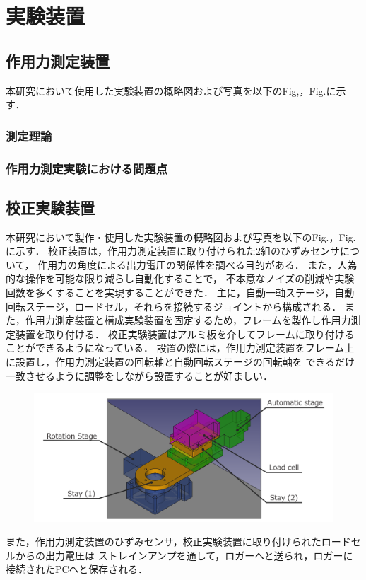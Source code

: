 \section{実験装置}

\subsection{作用力測定装置}
本研究において使用した実験装置の概略図および写真を以下のFig,，Fig.に示す．

\subsubsection{測定理論}

\subsubsection{作用力測定実験における問題点}

\subsection{校正実験装置}
本研究において製作・使用した実験装置の概略図および写真を以下のFig.，Fig.に示す．
校正装置は，作用力測定装置に取り付けられた2組のひずみセンサについて，
作用力の角度による出力電圧の関係性を調べる目的がある．
また，人為的な操作を可能な限り減らし自動化することで，
不本意なノイズの削減や実験回数を多くすることを実現することができた．
主に，自動一軸ステージ，自動回転ステージ，ロードセル，それらを接続するジョイントから構成される．
また，作用力測定装置と構成実験装置を固定するため，フレームを製作し作用力測定装置を取り付ける．
校正実験装置はアルミ板を介してフレームに取り付けることができるようになっている．
設置の際には，作用力測定装置をフレーム上に設置し，作用力測定装置の回転軸と自動回転ステージの回転軸を
できるだけ一致させるように調整をしながら設置することが好ましい．

\begin{figure}[htbp]
    \footnotesize
    \begin{center}
        \includegraphics[width=120mm]{images/21-1.png}
        \caption{}
    \end{center}
\end{figure}

また，作用力測定装置のひずみセンサ，校正実験装置に取り付けられたロードセルからの出力電圧は
ストレインアンプを通して，ロガーへと送られ，ロガーに接続されたPCへと保存される．